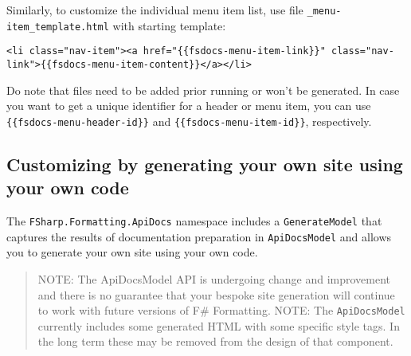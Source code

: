 \documentclass{article}
\begin{document}
Similarly, to customize the individual menu item list, use file \texttt{\_menu-item\_template.html} with starting template:
\begin{lstlisting}
<li class="nav-item"><a href="{{fsdocs-menu-item-link}}" class="nav-link">{{fsdocs-menu-item-content}}</a></li>

\end{lstlisting}


Do note that files need to be added prior running or won't be generated.
In case you want to get a unique identifier for a header or menu item, you can use \texttt{\{\{fsdocs-menu-header-id\}\}} and \texttt{\{\{fsdocs-menu-item-id\}\}}, respectively.
\subsection*{Customizing by generating your own site using your own code}



The \texttt{FSharp.Formatting.ApiDocs} namespace includes a \texttt{GenerateModel} that captures
the results of documentation preparation in \texttt{ApiDocsModel} and allows you to
generate your own site using your own code.
\begin{quote}


NOTE: The ApiDocsModel API is undergoing change and improvement and there is no guarantee that your bespoke site generation will continue to work
with future versions of F\# Formatting.
NOTE: The \texttt{ApiDocsModel} currently includes some generated HTML with some specific style tags.
In the long term these may be removed from the design of that component.
\end{quote}
\end{document}
